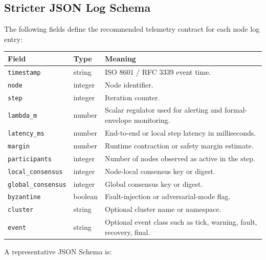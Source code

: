\documentclass[11pt]{article}
\begin{document}
\subsection{Stricter JSON Log Schema}
The following fields define the recommended telemetry contract for each node log entry:
\begin{center}
\begin{longtable}{|p{3cm}|p{2.2cm}|p{8cm}|}
\hline
\textbf{Field} & \textbf{Type} & \textbf{Meaning} \\
\hline
\texttt{timestamp} & string & ISO 8601 / RFC 3339 event time. \\
\hline
\texttt{node} & integer & Node identifier. \\
\hline
\texttt{step} & integer & Iteration counter. \\
\hline
\texttt{lambda\_m} & number & Scalar regulator used for alerting and formal-envelope monitoring. \\
\hline
\texttt{latency\_ms} & number & End-to-end or local step latency in milliseconds. \\
\hline
\texttt{margin} & number & Runtime contraction or safety margin estimate. \\
\hline
\texttt{participants} & integer & Number of nodes observed as active in the step. \\
\hline
\texttt{local\_consensus} & integer & Node-local consensus key or digest. \\
\hline
\texttt{global\_consensus} & integer & Global consensus key or digest. \\
\hline
\texttt{byzantine} & boolean & Fault-injection or adversarial-mode flag. \\
\hline
\texttt{cluster} & string & Optional cluster name or namespace. \\
\hline
\texttt{event} & string & Optional event class such as tick, warning, fault, recovery, final. \\
\hline
\end{longtable}
\end{center}

A representative JSON Schema is:
\end{document}
